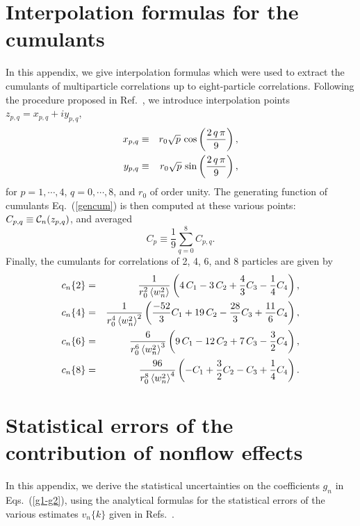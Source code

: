 \documentclass[aps,prc,superscriptaddress,showpacs,floatfix,nofootinbib]{revtex4}
\newcommand{\mean}[1]{\left\langle #1 \right\rangle}
\begin{document}
\section{Interpolation formulas for the cumulants}
\label{s:interpolation}
In this appendix, we give interpolation formulas which were used to
extract the cumulants of multiparticle correlations up to
eight-particle correlations.  Following the procedure proposed in
Ref.~\cite{Borghini:2001vi}, we introduce interpolation points
$z_{p,q}=x_{p,q}+iy_{p,q}$,
\begin{eqnarray}
\label{defxy}
x_{p,q}&\equiv& r_0\sqrt{p}\,\cos\left(\frac{2\,q\,\pi}{9}\right),\cr
y_{p,q}&\equiv& r_0\sqrt{p}\,\sin\left(\frac{2\,q\,\pi}{9}\right),
\end{eqnarray}
for $p=1,\cdots,4$, $q=0,\cdots,8$, and $r_0$ of order unity.  The
generating function of cumulants Eq.\ (\ref{gencum}) is then computed
at these various points: $C_{p,q} \equiv {\cal C}_n( z_{p,q})$, and
averaged
\begin{equation}
C_p\equiv \frac{1}{9}\sum_{q=0}^8 C_{p,q}.
\end{equation}
Finally, the cumulants for correlations of 2, 4, 6, and 8 particles
are given by
\begin{eqnarray}
\label{cum_int}
\displaystyle c_n\{2\} &=& 
\frac{1}{r_0^2\mean{w_n^2}} \left( 4\,C_1- 3\,C_2+\frac{4}{3}C_3 - \frac{1}{4}C_4 \right), 
\cr
\displaystyle c_n\{4\} &=& 
\frac{1}{r_0^4\mean{w_n^2}^2} \left( \frac{-52}{3} C_1+19\,C_2-\frac{28}{3} C_3 + 
\frac{11}{6} C_4 \right), \cr
\displaystyle c_n\{6\} &=& 
\frac{6}{r_0^6\mean{w_n^2}^3} \left(9\, C_1-12\,C_2+7\,C_3-\frac{3}{2}C_4\right), \cr 
\displaystyle c_n\{8\} &=& 
\frac{96}{r_0^8\mean{w_n^2}^4} \left(-C_1+\frac{3}{2}C_2-C_3+\frac{1}{4}C_4\right).
\end{eqnarray}


\section{Statistical errors of the contribution of nonflow effects}
\label{s:nonflow-error}


In this appendix, we derive the statistical uncertainties on the
coefficients $g_n$ in Eqs.\ (\ref{g1-g2}), using the analytical
formulas for the statistical errors of the various estimates
$v_n\{k\}$ given in Refs.~\cite{Borghini:2001vi,Borghini:2002vp}.
\end{document}
